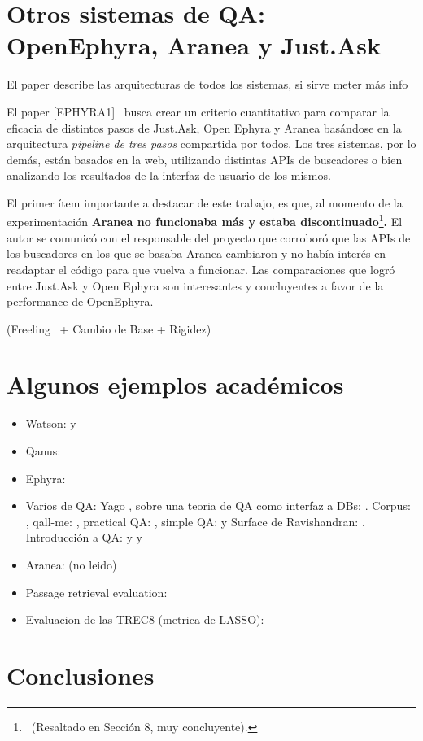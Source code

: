 \bigskip

\section{Otros sistemas de QA: OpenEphyra, Aranea y Just.Ask}

\bigskip

El paper describe las arquitecturas de todos los sistemas, si sirve
meter más info

El paper [EPHYRA1] \ busca crear un criterio cuantitativo para comparar
la eficacia de distintos pasos de Just.Ask, Open Ephyra y Aranea
basándose en la arquitectura \textit{pipeline de tres pasos}
compartida por todos. Los tres sistemas, por lo demás, están
basados en la web, utilizando distintas APIs de buscadores o bien
analizando los resultados de la interfaz de usuario de los mismos. 

El primer ítem importante a destacar de este trabajo, es que, al
momento de la experimentación \textbf{Aranea no funcionaba más y
estaba discontinuado}\footnote{\ (Resaltado en Sección 8, muy
concluyente).\par }\textbf{. }El autor se comunicó con el responsable
del proyecto que corroboró que las APIs de los buscadores en los que
se basaba Aranea cambiaron y no había interés en readaptar el
código para que vuelva a funcionar. Las comparaciones que logró
entre Just.Ask y Open Ephyra son interesantes y concluyentes a favor de
la performance de OpenEphyra. 

(Freeling \ + Cambio de Base + Rigidez)

\section{Algunos ejemplos académicos}

\begin{itemize}
\item Watson: \cite{WATSON1} y \cite{WATSON2}
\item Qanus: \cite{QANUS1}

\item Ephyra: \cite{EPHYRA1}
\item Varios de QA: Yago \cite{YAGO-QA1}, sobre una teoria de QA como interfaz a DBs: \cite{QADB1}. Corpus: \cite{TRAIN-QA1}, qall-me: \cite{QALL-ME1}, practical QA: \cite{QAS1}, simple QA: \cite{QAS2} y Surface de Ravishandran: \cite{SURF1}. Introducción a QA: \cite{QA1} y \cite{QA2} y \cite{QA3}
\item Aranea: \cite{ARANEA1} (no leido)
\item Passage retrieval evaluation: \cite{PASSAGE1}
\item Evaluacion de las TREC8 (metrica de \cite{QA3} LASSO): \cite{TREC8}
\end{itemize}

\section{Conclusiones}
